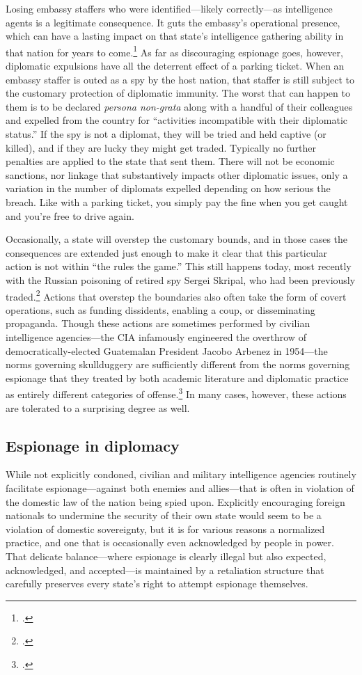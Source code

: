 \documentclass{memoir}
\begin{document}
\begin{refsegment}
Losing embassy staffers who were identified---likely correctly---as intelligence agents is a legitimate consequence. It guts the embassy's operational presence, which can have a lasting impact on that state's intelligence gathering ability in that nation for years to come.\footcite{macintyre_spy_2018} As far as discouraging espionage goes, however, diplomatic expulsions have all the deterrent effect of a parking ticket. When an embassy staffer is outed as a spy by the host nation, that staffer is still subject to the customary protection of diplomatic immunity. The worst that can happen to them is to be declared \emph{persona non-grata} along with a handful of their colleagues and expelled from the country for ``activities incompatible with their diplomatic status.'' If the spy is not a diplomat, they will be tried and held captive (or killed), and if they are lucky they might get traded. Typically no further penalties are applied to the state that sent them. There will not be economic sanctions, nor linkage that substantively impacts other diplomatic issues, only a variation in the number of diplomats expelled depending on how serious the breach. Like with a parking ticket, you simply pay the fine when you get caught and you're free to drive again.

Occasionally, a state will overstep the customary bounds, and in those cases the consequences are extended just enough to make it clear that this particular action is not within ``the rules the game.'' This still happens today, most recently with the Russian poisoning of retired spy Sergei Skripal, who had been previously traded.\footcite{masters_has_2018} Actions that overstep the boundaries also often take the form of covert operations, such as funding dissidents, enabling a coup, or disseminating propaganda. Though these actions are sometimes performed by civilian intelligence agencies---the CIA infamously engineered the overthrow of democratically-elected Guatemalan President Jacobo Arbenez in 1954---the norms governing skullduggery are sufficiently different from the norms governing espionage that they treated by both academic literature and diplomatic practice as entirely different categories of offense.\footcite{fraser_architecture_2005} In many cases, however, these actions are tolerated to a surprising degree as well.

\subsection{Espionage in diplomacy}
While not explicitly condoned, civilian and military intelligence agencies routinely facilitate espionage---against both enemies and allies---that is often in violation of the domestic law of the nation being spied upon. Explicitly encouraging foreign nationals to undermine the security of their own state would seem to be a violation of domestic sovereignty, but it is for various reasons a normalized practice, and one that is occasionally even acknowledged by people in power. That delicate balance---where espionage is clearly illegal but also expected, acknowledged, and accepted---is maintained by a retaliation structure that carefully preserves every state's right to attempt espionage themselves.


\end{refsegment}
\end{document}
